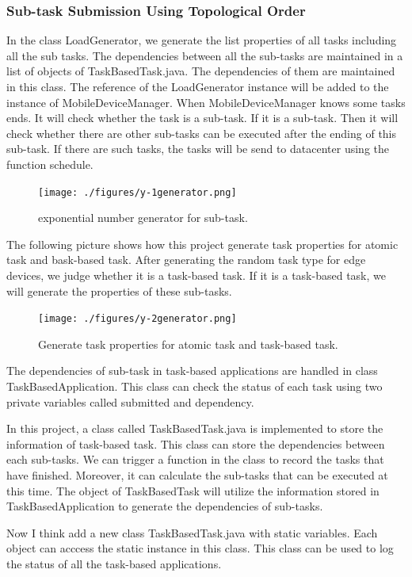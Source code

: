\subsubsection{Sub-task Submission Using Topological Order}
In the class LoadGenerator, we generate the list properties of all tasks including all the sub tasks. The dependencies between all the sub-tasks are maintained in a list of objects of TaskBasedTask.java. The dependencies of them are maintained in this class. The reference of the LoadGenerator instance will be added to the instance of MobileDeviceManager. When MobileDeviceManager knows some tasks ends. It will check whether the task is a sub-task. If it is a sub-task. Then it will check whether there are other sub-tasks can be executed after the ending of this sub-task. If there are such tasks, the tasks will be send to datacenter using the function schedule.

\begin{figure}
	\centering
	\texttt{[image: ./figures/y-1generator.png]}
	\caption{\label{fig:frog}exponential number generator for sub-task.}
\end{figure}


The following picture shows how this project generate task properties for atomic task and bask-based task. After generating the random task type for edge devices, we judge whether it is a task-based task. If it is a task-based task, we will generate the properties of these sub-tasks.
\begin{figure}
	\centering
	\texttt{[image: ./figures/y-2generator.png]}
	\caption{\label{fig:frog}Generate task properties for atomic task and task-based task.}
\end{figure}

The dependencies of sub-task in task-based applications are handled in class TaskBasedApplication. This class can check the status of each task using two private variables called submitted and dependency. 

In this project, a class called TaskBasedTask.java is implemented to store the information of task-based task. This class can store the dependencies between each sub-tasks. We can trigger a function in the class to record the tasks that have finished. Moreover, it can calculate the sub-tasks that can be executed at this time. The object of TaskBasedTask will utilize the information stored in TaskBasedApplication to generate the dependencies of sub-tasks.


Now I think add a new class TaskBasedTask.java with static variables. Each object can acccess the static instance in this class. This class can be used to log the status of all the task-based applications.

